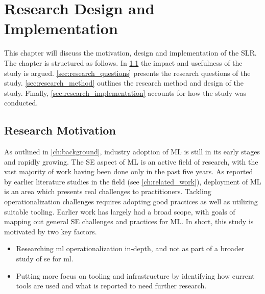 \chapter{Research Design and Implementation}
\label{ch:research_design_and_implementation}
This chapter will discuss the motivation, design and implementation of the SLR.
The chapter is structured as follows.
In \cref{sec:research_motivation} the impact and usefulness of the study is argued.
\cref{sec:research_questions} presents the research questions of the study.
\cref{sec:research_method} outlines the research method and design of the study.
Finally, \cref{sec:research_implementation} accounts for how the study was conducted.

\section{Research Motivation}
\label{sec:research_motivation}
As outlined in \cref{ch:background}, industry adoption of ML is still in its early stages and rapidly growing.
The SE aspect of ML is an active field of research, with the vast majority of work having been done only in the past five years.
As reported by earlier literature studies in the field (see \cref{ch:related_work}), deployment of ML is an area which presents real challenges to practitioners.
Tackling operationalization challenges requires adopting good practices as well as utilizing suitable tooling.
Earlier work has largely had a broad scope, with goals of mapping out general SE challenges and practices for ML.
In short, this study is motivated by two key factors.
\begin{itemize}
    \item Researching \acrshort{ml} operationalization in-depth, and not as part of a broader study of \acrshort{se} for \acrshort{ml}.
    \item Putting more focus on tooling and infrastructure by identifying how current tools are used and what is reported to need further research.
\end{itemize}

